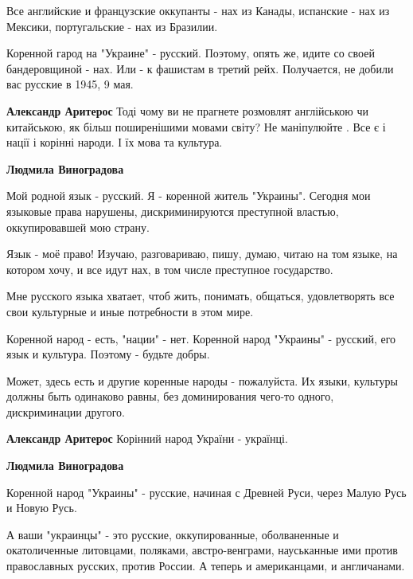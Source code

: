 \begin{itemize}
\begin{itemize}
Все английские и французские оккупанты - нах из Канады, испанские - нах из
Мексики, португальские - нах из Бразилии.

Коренной гарод на "Украине" - русский. Поэтому, опять же, идите со своей
бандеровщиной - нах. Или - к фашистам в третий рейх. Получается, не добили вас
русские в 1945, 9 мая.


\textbf{Александр Аритерос} Тоді чому ви не прагнете розмовлят англійською чи китайською, як більш поширенішими мовами світу? Не маніпулюйте . Все є і нації і корінні народи. І їх мова та культура.


\textbf{Людмила Виноградова} 

Мой родной язык - русский. Я - коренной житель "Украины". Сегодня мои языковые
права нарушены, дискриминируются преступной властью, оккупировавшей мою страну.

Язык - моё право! Изучаю, разговариваю, пишу, думаю, читаю на том языке, на
котором хочу, и все идут нах, в том числе преступное государство.

Мне русского языка хватает, чтоб жить, понимать, общаться, удовлетворять все
свои культурные и иные потребности в этом мире.

Коренной народ - есть, "нации" - нет. Коренной народ "Украины" - русский, его
язык и культура. Поэтому - будьте добры.

Может, здесь есть и другие коренные народы - пожалуйста. Их языки, культуры
должны быть одинаково равны, без доминирования чего-то одного, дискриминации
другого.


\textbf{Александр Аритерос} Корінний народ України - українці.


\textbf{Людмила Виноградова} 

Коренной народ "Украины" - русские, начиная с Древней Руси, через Малую Русь и Новую Русь.

А ваши "украинцы" - это русские, оккупированные, оболваненные и окатоличенные
литовцами, поляками, австро-венграми, науськанные ими против православных
русских, против России. А теперь и американцами, и англичанами.


\end{itemize}
\end{itemize}
